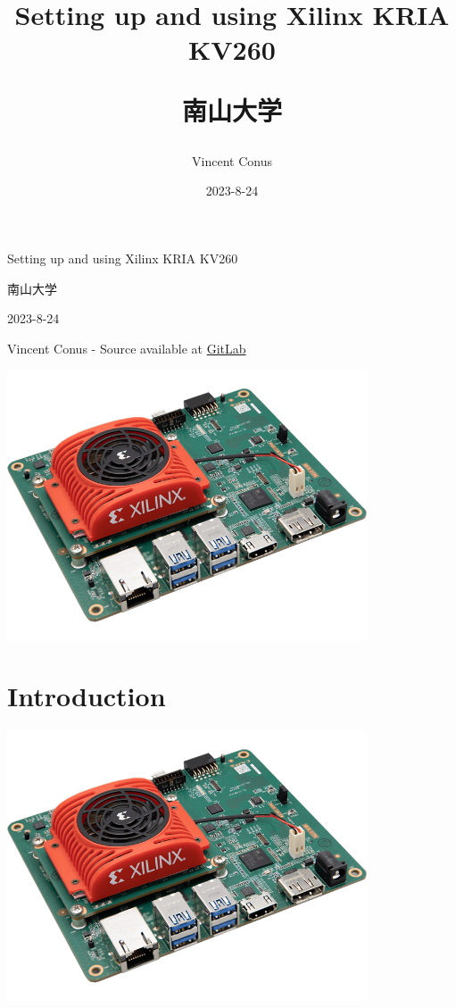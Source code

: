\documentclass[10pt]{article}
\author{Vincent Conus}
\date{2023-8-24}
\title{Setting up and using Xilinx KRIA KV260\\\medskip
\large \begin{CJK}{UTF8}{min}南山大学\end{CJK}}
\newcommand{\gitlab}[1]{%
\href{#1}{GitLab \faGitlab}}
\begin{document}
\begin{titlepage}
\centering
{\LARGE Setting up and using Xilinx KRIA KV260 \par }
\vspace{5mm}
{\large \begin{CJK}{UTF8}{min}南山大学\end{CJK} \par}
\vspace{1cm}
{\large 2023-8-24 \par}
\vspace{2cm}
{\large Vincent Conus -  Source available at \gitlab{https://gitlab.com/sunoc/xilinx-kria-kv260-documentation} \par}
\vspace{3cm}
\includegraphics[width=0.8\textwidth]{./img/board}\end{titlepage}
\tableofcontents
\pagebreak
\section{Introduction}
\label{sec:org9fa8d2b}
\includegraphics[width=0.8\textwidth]{./img/board.png}
\end{document}
